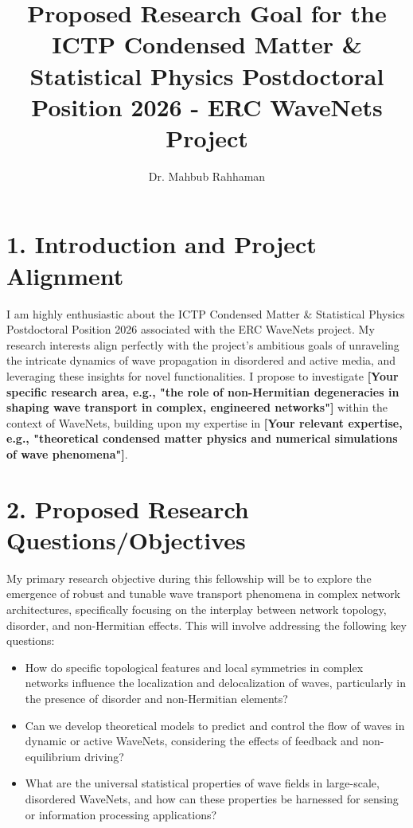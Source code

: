 \documentclass[a4paper, 11pt]{article}
\title{Proposed Research Goal for the ICTP Condensed Matter \& Statistical Physics Postdoctoral Position 2026 - ERC WaveNets Project}
\author{Dr. Mahbub Rahhaman}
\date{} %
\begin{document}
\maketitle

\section*{1. Introduction and Project Alignment}
I am highly enthusiastic about the ICTP Condensed Matter \& Statistical Physics Postdoctoral Position 2026 associated with the ERC WaveNets project. My research interests align perfectly with the project's ambitious goals of unraveling the intricate dynamics of wave propagation in disordered and active media, and leveraging these insights for novel functionalities. I propose to investigate \textbf{[Your specific research area, e.g., "the role of non-Hermitian degeneracies in shaping wave transport in complex, engineered networks"]} within the context of WaveNets, building upon my expertise in \textbf{[Your relevant expertise, e.g., "theoretical condensed matter physics and numerical simulations of wave phenomena"]}.

\section*{2. Proposed Research Questions/Objectives}
My primary research objective during this fellowship will be to explore the emergence of robust and tunable wave transport phenomena in complex network architectures, specifically focusing on the interplay between network topology, disorder, and non-Hermitian effects. This will involve addressing the following key questions:
\begin{itemize}
    \item How do specific topological features and local symmetries in complex networks influence the localization and delocalization of waves, particularly in the presence of disorder and non-Hermitian elements?
    \item Can we develop theoretical models to predict and control the flow of waves in dynamic or active WaveNets, considering the effects of feedback and non-equilibrium driving?
    \item What are the universal statistical properties of wave fields in large-scale, disordered WaveNets, and how can these properties be harnessed for sensing or information processing applications?
\end{itemize}
\end{document}
